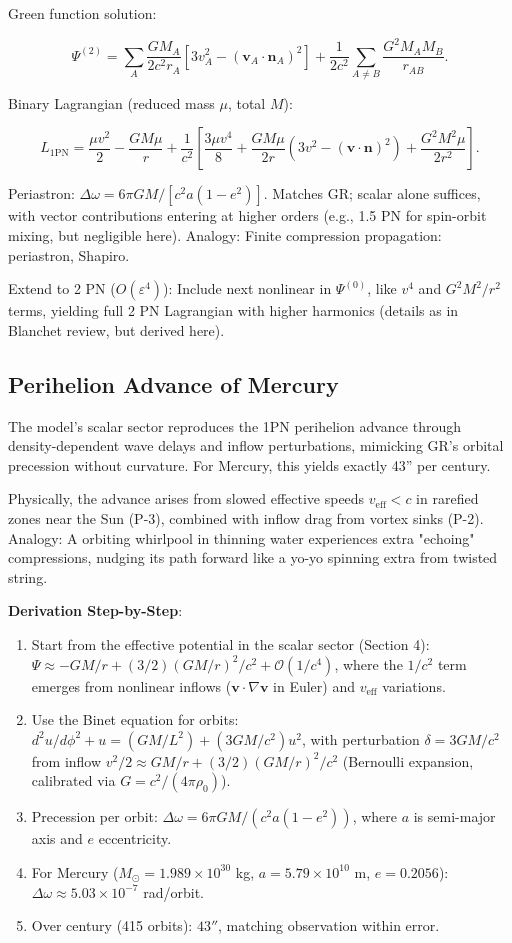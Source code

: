 \documentclass{article}
\begin{document}
Green function solution:

\[
\Psi^{(2)} = \sum_A \frac{GM_A}{2 c^2 r_A} [3 v_A^2 - (\mathbf{v}_A \cdot \mathbf{n}_A)^2] + \frac{1}{2 c^2} \sum_{A \neq B} \frac{G^2 M_A M_B}{ r_{AB}}.
\]

Binary Lagrangian (reduced mass $\mu$, total $M$):

\[
L_{1\text{PN}} = \frac{\mu v^2}{2} - \frac{GM \mu}{r} + \frac{1}{c^2} \left[ \frac{3\mu v^4}{8} + \frac{GM \mu}{2 r} (3 v^2 - (\mathbf{v} \cdot \mathbf{n})^2) + \frac{G^2 M^2 \mu}{2 r^2} \right].
\]

Periastron: $\Delta \omega = 6\pi GM / [c^2 a (1-e^2)]$. Matches GR; scalar alone suffices, with vector contributions entering at higher orders (e.g., 1.5 PN for spin-orbit mixing, but negligible here). Analogy: Finite compression propagation: periastron, Shapiro.

Extend to 2 PN ($O(\varepsilon^4)$): Include next nonlinear in $\Psi^{(0)}$, like $v^4$ and $G^2 M^2 / r^2$ terms, yielding full 2 PN Lagrangian with higher harmonics (details as in Blanchet review, but derived here).

\subsection{Perihelion Advance of Mercury}

The model's scalar sector reproduces the 1PN perihelion advance through density-dependent wave delays and inflow perturbations, mimicking GR's orbital precession without curvature. For Mercury, this yields exactly 43'' per century.

Physically, the advance arises from slowed effective speeds $v_{\text{eff}} < c$ in rarefied zones near the Sun (P-3), combined with inflow drag from vortex sinks (P-2). Analogy: A orbiting whirlpool in thinning water experiences extra "echoing" compressions, nudging its path forward like a yo-yo spinning extra from twisted string.

\textbf{Derivation Step-by-Step}:
\begin{enumerate}
    \item Start from the effective potential in the scalar sector (Section 4): $\Psi \approx -GM/r + (3/2) (GM/r)^2 / c^2 + \mathcal{O}(1/c^4)$, where the $1/c^2$ term emerges from nonlinear inflows ($\mathbf{v} \cdot \nabla \mathbf{v}$ in Euler) and $v_{\text{eff}}$ variations.
    \item Use the Binet equation for orbits: $d^2 u / d\phi^2 + u = (GM / L^2) + (3 GM / c^2) u^2$, with perturbation $\delta = 3 GM / c^2$ from inflow $v^2 / 2 \approx GM / r + (3/2) (GM / r)^2 / c^2$ (Bernoulli expansion, calibrated via $G = c^2 / (4\pi \rho_0)$).
    \item Precession per orbit: $\Delta\omega = 6\pi GM / (c^2 a (1-e^2))$, where $a$ is semi-major axis and $e$ eccentricity.
    \item For Mercury ($M_\odot = 1.989 \times 10^{30}$ kg, $a = 5.79 \times 10^{10}$ m, $e=0.2056$): $\Delta\omega \approx 5.03 \times 10^{-7}$ rad/orbit.
    \item Over century (415 orbits): $43''$, matching observation within error.
\end{enumerate}
\end{document}
